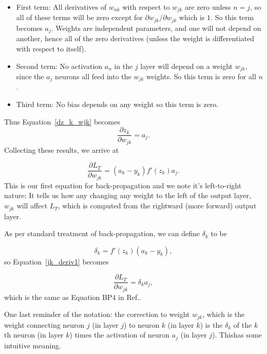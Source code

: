 \documentclass[12pt]{article}
\begin{document}
\begin{itemize}
\item First term: All derivatives of $w_{nk}$ with respect to $w_{jk}$ are zero unless $n=j$, so all of these terms will be zero except for $\partial{ w_{jk}}/\partial{w_{jk}}$ which is $1$. So this term becomes $a_j$.  Weights are independent parameters, and one will not depend on another, hence all of the zero derivatives (unless the weight is differentiated with respect to itself).

\item Second term: No activation $a_n$ in the $j$ layer will depend on a weight $w_{jk}$, since the $a_j$ neurons all feed into the $w_{jk}$ weights.  So this term is zero for all $n$.

\item Third term:  No bias depends on any weight so this term is zero.

\end{itemize} 
Thus Equation~\ref{dz_k_wjk} becomes
\begin{equation}
\frac{\partial z_k}{\partial w_{jk}} = a_j.
\end{equation} 
Collecting these results, we arrive at

\begin{equation}
\frac{\partial L_T}{\partial w_{jk}} = (a_k-y_k) f'(z_k) a_j.
\label{jk_deriv1}
\end{equation}
This is our first equation for back-propagation and we note it's left-to-right nature: It tells us how any changing any weight to the left of the output layer, $w_{jk}$ will affect $L_T$, which is computed from the rightward (more forward) output layer.

As per standard treatment of back-propagation, we can define $\delta_k$ to be

\begin{equation}
\delta_k = f'(z_k)(a_k-y_k),
\label{delta_k}
\end{equation}
so Equation~\ref{jk_deriv1} becomes

\begin{equation}
\frac{\partial L_T}{\partial w_{jk}} = \delta_k a_j,
\label{bp1}
\end{equation}
which is the same as Equation BP4 in Ref.\cite{nielson}.

One last reminder of the notation: the correction to weight $w_{jk}$, which is the weight connecting neuron $j$ (in layer $j$) to neuron $k$ (in layer $k$) is the $\delta_k$ of the $k$th neuron (in layer $k$) times the activation of neuron $a_j$ (in layer $j$). Thishas some intuitive meaning.  
\end{document}
